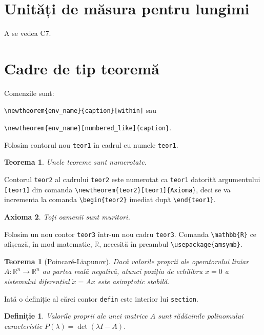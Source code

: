 \documentclass{article}
\begin{document}
\section{Unități de măsura pentru lungimi}
A se vedea C7.
\section{Cadre de tip teoremă}
Comenzile sunt:\par
 \verb+\newtheorem{env_name}{caption}[within]+ sau \par
 \verb+\newtheorem{env_name}[numbered_like]{caption}+. \par
Folosim contorul nou \verb+teor1+ în cadrul cu numele \verb+teor1+.
\newtheorem{teor1}{Teorema}
\newtheorem{teor2}[teor1]{Axioma}
\begin{teor1}
 Unele teoreme sunt numerotate.
\end{teor1}
Contorul \verb+teor2+ al cadrului \verb+teor2+ este numerotat ca \verb+teor1+ datorită argumentului \verb+[teor1]+ din comanda \verb+\newtheorem{teor2}[teor1]{Axioma}+, deci se va incrementa la comanda \verb+\begin{teor2}+ imediat după \verb+\end{teor1}+.
\begin{teor2}
Toți oamenii sunt muritori.
\end{teor2}
Folosim un nou contor \verb+teor3+ într-un nou cadru \verb+teor3+. Comanda \verb+\mathbb{R}+ ce afișează, în mod matematic, $\mathbb{R}$, necesită în preambul \verb+\usepackage{amsymb}+.
\newtheorem{teor3}{Teorema}
\begin{teor3}[Poincar\'{e}-Liapunov] Dacă valorile proprii ale operatorului liniar  $A:\mathbb{R}^n \rightarrow \mathbb{R} ^n$ au partea reală negativă, atunci poziția de echilibru $x=0$ a sistemului diferențial $\dot{x}=Ax$  este asimptotic stabilă.
\end{teor3}
Iată o definiție al cărei contor \verb+defin+ este interior lui \verb+section+.
\newtheorem{defin}{Definiție}[section]
\begin{defin} 
Valorile proprii ale unei matrice $A$ sunt rădăcinile polinomului caracteristic $P(\lambda)=\det(\lambda I -A)$.
\end{defin}
\end{document}
